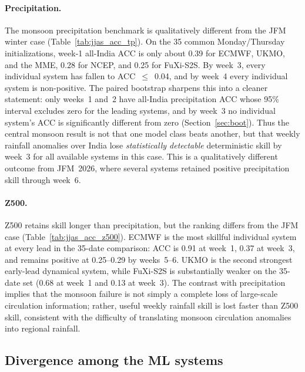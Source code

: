 \documentclass[11pt,a4paper]{article}
\begin{document}
\paragraph{Precipitation.}
The monsoon precipitation benchmark is qualitatively different from the JFM
winter case (Table~\ref{tab:jjas_acc_tp}). On the 35 common Monday/Thursday
initializations, week-1 all-India ACC is only about 0.39 for ECMWF, UKMO, and
the MME, 0.28 for NCEP, and 0.25 for FuXi-S2S. By week~3, every individual
system has fallen to ACC~$\le$~0.04, and by week~4 every individual system is
non-positive. The paired bootstrap sharpens this into a cleaner statement: only
weeks~1 and~2 have all-India precipitation ACC whose 95\% interval excludes
zero for the leading systems, and by week~3 no individual system's ACC is
significantly different from zero (Section~\ref{sec:boot}). Thus the central
monsoon result is not that one model class beats another, but that weekly
rainfall anomalies over India lose \emph{statistically detectable}
deterministic skill by week~3 for all available systems in this case. This is a
qualitatively different outcome from JFM~2026, where several systems retained
positive precipitation skill through week~6.

\paragraph{Z500.}
Z500 retains skill longer than precipitation, but the ranking differs from the
JFM case (Table~\ref{tab:jjas_acc_z500}). ECMWF is the most skillful
individual system at every lead in the 35-date comparison: ACC is 0.91 at
week~1, 0.37 at week~3, and remains positive at 0.25--0.29 by weeks~5--6.
UKMO is the second strongest early-lead dynamical system, while FuXi-S2S is
substantially weaker on the 35-date set (0.68 at week~1 and 0.13 at week~3).
The contrast with precipitation implies that the monsoon failure is not simply
a complete loss of large-scale circulation information; rather, useful weekly
rainfall skill is lost faster than Z500 skill, consistent with the difficulty
of translating monsoon circulation anomalies into regional rainfall.




\subsection{Divergence among the ML systems}\label{sec:ml_divergence}
\end{document}
